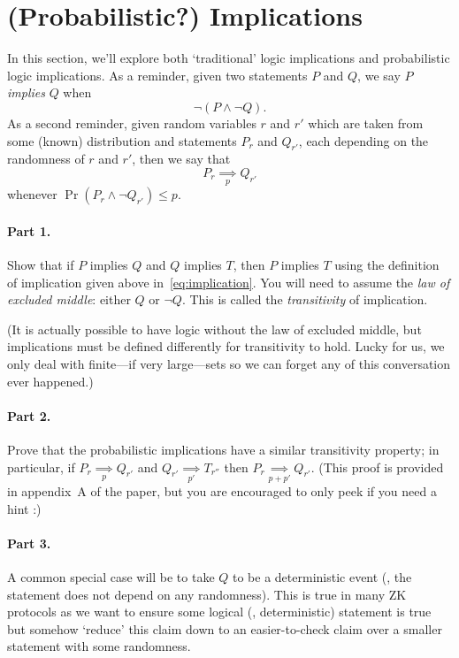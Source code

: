 \documentclass[12pt]{article}
\newcommand{\impliesn}[1]{\underset{#1}{\implies}}
\newcommand{\impliesp}{\impliesn{p}}
\newcommand{\impliespp}{\impliesn{p'}}
\begin{document}
\section{(Probabilistic?) Implications}
In this section, we'll explore both `traditional' logic implications
and probabilistic logic implications. As a reminder, given two statements
$P$ and $Q$, we say $P$ \emph{implies} $Q$ when
\begin{equation}\label{eq:implication}
    \neg(P \wedge \neg Q).
\end{equation}
As a second reminder, given random variables $r$ and $r'$ which are taken
from some (known) distribution and statements $P_r$ and $Q_{r'}$, each
depending on the randomness of $r$ and $r'$, then we say that
\[
    P_r \impliesp Q_{r'}
\]
whenever $\Pr(P_r \wedge \neg Q_{r'}) \le p$.


\paragraph{Part 1.} Show that if $P$ implies $Q$ and $Q$ implies $T$, then $P$
implies $T$ using the definition of implication given
above in~\eqref{eq:implication}. You will need to assume the \emph{law of
excluded middle}: either $Q$ or $\neg Q$. This is called the \emph{transitivity}
of implication.

(It is actually possible to have logic without the law of excluded middle, but
implications must be defined differently for transitivity to hold. Lucky for
us, we only deal with finite---if very large---sets so we can forget any of
this conversation ever happened.)

\paragraph{Part 2.} Prove that the probabilistic implications have a similar
transitivity property; in particular, if $P_r \impliesp Q_{r'}$ and $Q_{r'}
\impliespp T_{r''}$ then $P_r \impliesn{p + p'} Q_{r'}$. (This proof is
provided in appendix~A of the paper, but you are encouraged to only peek if you
need a hint :)

\paragraph{Part 3.} A common special case will be to take $Q$ to be a
deterministic event (\ie, the statement does not depend on any randomness).
This is true in many ZK protocols as we want to ensure some logical (\ie,
deterministic) statement is true but somehow `reduce' this claim down to an
easier-to-check claim over a smaller statement with some randomness.
\end{document}
